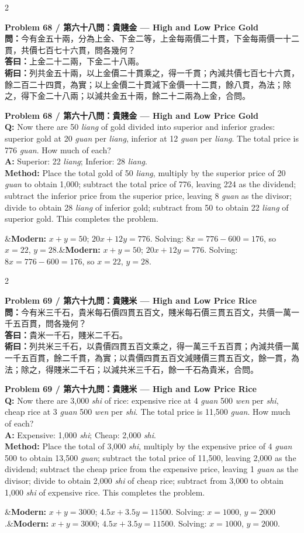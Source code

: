 \documentclass[11pt,a4paper]{article}
\newcommand{\bilingualproblem}[4]{%
  \begin{paracol}{2}
  \begin{leftcolumn}
  \noindent\textbf{\color{problemcolor}#1}\\[0.2cm]
  #2
  \end{leftcolumn}
  \switchcolumn
  \noindent\textbf{\color{problemcolor}#1}\\[0.2cm]
  #3
  \end{paracol}
  \ifx&#4&\else\vspace{0.3cm}\noindent#4\fi
  \vspace{0.5cm}
}
\newcommand{\wen}[1]{\textcolor{problemcolor}{\textbf{問：}}#1}
\newcommand{\da}[1]{\textcolor{answercolor}{\textbf{答曰：}}#1}
\newcommand{\shu}[1]{\textcolor{methodcolor}{\textbf{術曰：}}#1}
\newcommand{\wenen}[1]{\textcolor{problemcolor}{\textbf{Q:}} #1}
\newcommand{\daen}[1]{\textcolor{answercolor}{\textbf{A:}} #1}
\newcommand{\shuen}[1]{\textcolor{methodcolor}{\textbf{Method:}} #1}
\begin{document}
\bilingualproblem{Problem 68 / 第六十八問：貴賤金 --- High and Low Price Gold}{
\wen{今有金五十兩，分為上金、下金二等，上金每兩價二十貫，下金每兩價一十二貫，共價七百七十六貫，問各幾何？}\\[0.2cm]
\da{上金二十二兩，下金二十八兩。}\\[0.2cm]
\shu{列共金五十兩，以上金價二十貫乘之，得一千貫；內減共價七百七十六貫，餘二百二十四貫，為實；以上金價二十貫減下金價一十二貫，餘八貫，為法；除之，得下金二十八兩；以減共金五十兩，餘二十二兩為上金，合問。}
}{
\wenen{Now there are 50 \textit{liang} of gold divided into superior and inferior grades: superior gold at 20 \textit{guan} per \textit{liang}, inferior at 12 \textit{guan} per \textit{liang}. The total price is 776 \textit{guan}. How much of each?}\\[0.2cm]
\daen{Superior: 22 \textit{liang}; Inferior: 28 \textit{liang}.}\\[0.2cm]
\shuen{Place the total gold of 50 \textit{liang}, multiply by the superior price of 20 \textit{guan} to obtain 1,000; subtract the total price of 776, leaving 224 as the dividend; subtract the inferior price from the superior price, leaving 8 \textit{guan} as the divisor; divide to obtain 28 \textit{liang} of inferior gold; subtract from 50 to obtain 22 \textit{liang} of superior gold. This completes the problem.}
}{\textbf{Modern:} $x + y = 50$; $20x + 12y = 776$. Solving: $8x = 776 - 600 = 176$, so $x = 22$, $y = 28$.}

\newpage

\bilingualproblem{Problem 69 / 第六十九問：貴賤米 --- High and Low Price Rice}{
\wen{今有米三千石，貴米每石價四貫五百文，賤米每石價三貫五百文，共價一萬一千五百貫，問各幾何？}\\[0.2cm]
\da{貴米一千石，賤米二千石。}\\[0.2cm]
\shu{列共米三千石，以貴價四貫五百文乘之，得一萬三千五百貫；內減共價一萬一千五百貫，餘二千貫，為實；以貴價四貫五百文減賤價三貫五百文，餘一貫，為法；除之，得賤米二千石；以減共米三千石，餘一千石為貴米，合問。}
}{
\wenen{Now there are 3,000 \textit{shi} of rice: expensive rice at 4 \textit{guan} 500 \textit{wen} per \textit{shi}, cheap rice at 3 \textit{guan} 500 \textit{wen} per \textit{shi}. The total price is 11,500 \textit{guan}. How much of each?}\\[0.2cm]
\daen{Expensive: 1,000 \textit{shi}; Cheap: 2,000 \textit{shi}.}\\[0.2cm]
\shuen{Place the total of 3,000 \textit{shi}, multiply by the expensive price of 4 \textit{guan} 500 to obtain 13,500 \textit{guan}; subtract the total price of 11,500, leaving 2,000 as the dividend; subtract the cheap price from the expensive price, leaving 1 \textit{guan} as the divisor; divide to obtain 2,000 \textit{shi} of cheap rice; subtract from 3,000 to obtain 1,000 \textit{shi} of expensive rice. This completes the problem.}
}{\textbf{Modern:} $x + y = 3000$; $4.5x + 3.5y = 11500$. Solving: $x = 1000$, $y = 2000$.}
\end{document}
